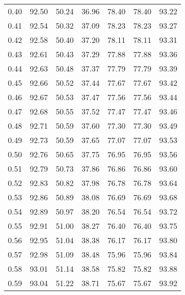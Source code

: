 \begin{tabular}{|c|c|c|c|c|c|c|}
      0.40 &     92.50 &     50.24 &      36.96 &   78.40 &      78.40 &         93.22 \\
      0.41 &     92.54 &     50.32 &      37.09 &   78.23 &      78.23 &         93.27 \\
      0.42 &     92.58 &     50.40 &      37.20 &   78.11 &      78.11 &         93.31 \\
      0.43 &     92.61 &     50.43 &      37.29 &   77.88 &      77.88 &         93.36 \\
      0.44 &     92.63 &     50.48 &      37.37 &   77.79 &      77.79 &         93.39 \\
      0.45 &     92.66 &     50.52 &      37.44 &   77.67 &      77.67 &         93.42 \\
      0.46 &     92.67 &     50.53 &      37.47 &   77.56 &      77.56 &         93.44 \\
      0.47 &     92.68 &     50.55 &      37.52 &   77.47 &      77.47 &         93.46 \\
      0.48 &     92.71 &     50.59 &      37.60 &   77.30 &      77.30 &         93.49 \\
      0.49 &     92.73 &     50.59 &      37.65 &   77.07 &      77.07 &         93.53 \\
      0.50 &     92.76 &     50.65 &      37.75 &   76.95 &      76.95 &         93.56 \\
      0.51 &     92.79 &     50.73 &      37.86 &   76.86 &      76.86 &         93.60 \\
      0.52 &     92.83 &     50.82 &      37.98 &   76.78 &      76.78 &         93.64 \\
      0.53 &     92.86 &     50.89 &      38.08 &   76.69 &      76.69 &         93.68 \\
      0.54 &     92.89 &     50.97 &      38.20 &   76.54 &      76.54 &         93.72 \\
      0.55 &     92.91 &     51.00 &      38.27 &   76.40 &      76.40 &         93.75 \\
      0.56 &     92.95 &     51.04 &      38.38 &   76.17 &      76.17 &         93.80 \\
      0.57 &     92.98 &     51.09 &      38.48 &   75.96 &      75.96 &         93.84 \\
      0.58 &     93.01 &     51.14 &      38.58 &   75.82 &      75.82 &         93.88 \\
      0.59 &     93.04 &     51.22 &      38.71 &   75.67 &      75.67 &         93.92 \\

\end{tabular}

